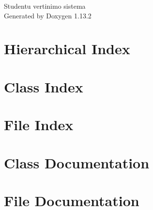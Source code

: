 \documentclass[twoside]{book}
\newcommand{\+}{\discretionary{\mbox{\scriptsize$\hookleftarrow$}}{}{}}
\newcommand{\clearemptydoublepage}{%
    \newpage{\pagestyle{empty}\cleardoublepage}%
  }
\begin{document}
  \raggedbottom
    \hypersetup{pageanchor=false,
                bookmarksnumbered=true,
                pdfencoding=unicode
               }
  \begin{titlepage}
  \vspace*{7cm}
  \begin{center}%
  {\Large Studentu vertinimo sistema}\\
  \vspace*{1cm}
  {\large Generated by Doxygen 1.13.2}\\
  \end{center}
  \end{titlepage}
  \clearemptydoublepage
  \tableofcontents
  \clearemptydoublepage
  \hypersetup{pageanchor=true}
\chapter{Hierarchical Index}

\chapter{Class Index}

\chapter{File Index}

\chapter{Class Documentation}


\chapter{File Documentation}














  \backmatter
  \newpage
  \clearemptydoublepage
  \printindex
\end{document}
